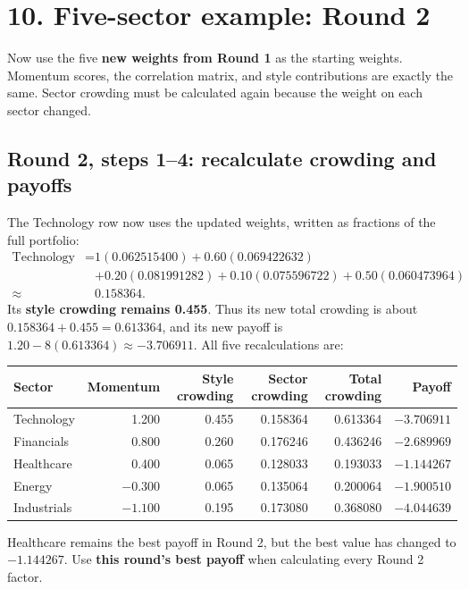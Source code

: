 \documentclass[11pt,letterpaper]{article}
\newcommand{\topic}[1]{\Needspace{5\baselineskip}\subsection*{#1}}
\newcommand{\word}[1]{\text{#1}}
\newcommand{\guidepage}[1]{\clearpage\section*{#1}}
\begin{document}
\guidepage{10. Five-sector example: Round 2}
Now use the five \textbf{new weights from Round 1} as the starting weights. Momentum scores, the correlation matrix, and style contributions are exactly the same. Sector crowding must be calculated again because the weight on each sector changed.

\topic{Round 2, steps 1--4: recalculate crowding and payoffs}
The Technology row now uses the updated weights, written as fractions of the full portfolio:
\[
\begin{aligned}
\word{Technology sector crowding}={}&1(0.062515400)+0.60(0.069422632)\\
&+0.20(0.081991282)+0.10(0.075596722)+0.50(0.060473964)\\
\approx{}&0.158364.
\end{aligned}
\]
Its \textbf{style crowding remains 0.455}. Thus its new total crowding is about $0.158364+0.455=0.613364$, and its new payoff is $1.20-8(0.613364)\approx-3.706911$. All five recalculations are:
\begin{center}
\small
\begin{tabular}{@{}lrrrrr@{}}
\toprule
Sector & Momentum & Style crowding & Sector crowding & Total crowding & Payoff\\
\midrule
Technology & 1.200 & 0.455 & 0.158364 & 0.613364 & $-3.706911$\\
Financials & 0.800 & 0.260 & 0.176246 & 0.436246 & $-2.689969$\\
Healthcare & 0.400 & 0.065 & 0.128033 & 0.193033 & $-1.144267$\\
Energy & $-0.300$ & 0.065 & 0.135064 & 0.200064 & $-1.900510$\\
Industrials & $-1.100$ & 0.195 & 0.173080 & 0.368080 & $-4.044639$\\
\bottomrule
\end{tabular}
\end{center}
Healthcare remains the best payoff in Round 2, but the best value has changed to $-1.144267$. Use \textbf{this round's best payoff} when calculating every Round 2 factor.
\end{document}
